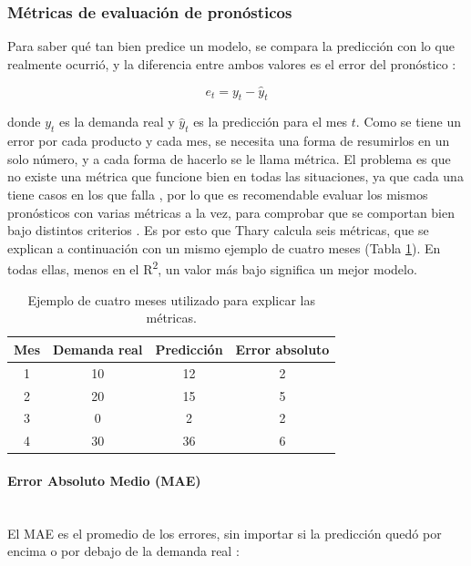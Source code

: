 \subsubsection{Métricas de evaluación de pronósticos}

Para saber qué tan bien predice un modelo, se compara la predicción con lo que realmente ocurrió, y la diferencia entre ambos valores es el error del pronóstico \cite{hewamalage2023evaluation}:

\begin{equation}
e_t = y_t - \hat{y}_t
\end{equation}

donde $y_t$ es la demanda real y $\hat{y}_t$ es la predicción para el mes $t$. Como se tiene un error por cada producto y cada mes, se necesita una forma de resumirlos en un solo número, y a cada forma de hacerlo se le llama métrica. El problema es que no existe una métrica que funcione bien en todas las situaciones, ya que cada una tiene casos en los que falla \cite{hewamalage2023evaluation}, por lo que es recomendable evaluar los mismos pronósticos con varias métricas a la vez, para comprobar que se comportan bien bajo distintos criterios \cite{hewamalage2023evaluation}. Es por esto que Thary calcula seis métricas, que se explican a continuación con un mismo ejemplo de cuatro meses (Tabla \ref{tab:ejemplo_metricas}). En todas ellas, menos en el R\textsuperscript{2}, un valor más bajo significa un mejor modelo.

\begin{table}[H]
    \centering
    \caption{Ejemplo de cuatro meses utilizado para explicar las métricas.}
    \label{tab:ejemplo_metricas}
    \renewcommand{\arraystretch}{1.3}
    \begin{tabular}{|c|c|c|c|}
    \hline
    \textbf{Mes} & \textbf{Demanda real} & \textbf{Predicción} & \textbf{Error absoluto} \\
    \hline
    1 & 10 & 12 & 2 \\
    \hline
    2 & 20 & 15 & 5 \\
    \hline
    3 & 0  & 2  & 2 \\
    \hline
    4 & 30 & 36 & 6 \\
    \hline
    \end{tabular}
\end{table}

\paragraph{Error Absoluto Medio (MAE)}\mbox{}\\
El MAE es el promedio de los errores, sin importar si la predicción quedó por encima o por debajo de la demanda real \cite{hewamalage2023evaluation}:

